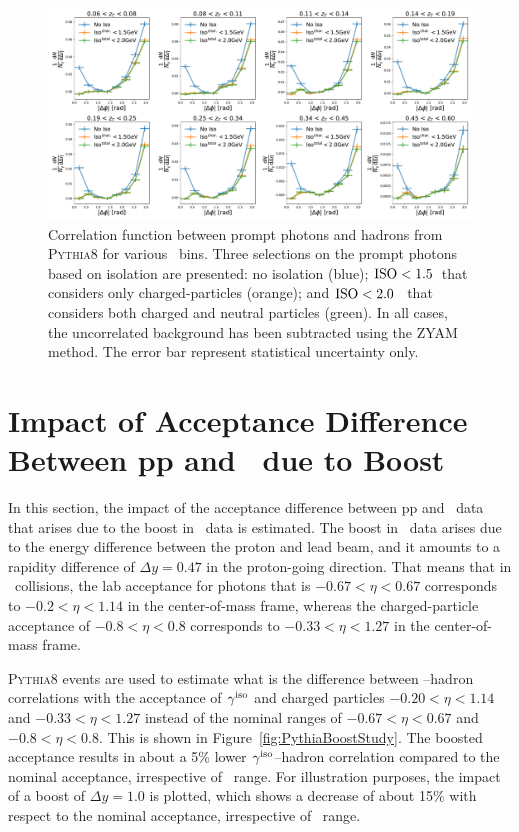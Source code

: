 \begin{figure}
\centering
\includegraphics[width = 1.0 \textwidth]{Checks_Systematics/PythiaStudyNeutralIso}
\caption{Correlation function between prompt photons and hadrons from \textsc{Pythia8} for various \zt~bins. Three selections on the prompt photons based on isolation are presented: no isolation (blue); $\mathrm{ISO}< 1.5$\GeVc~that considers only charged-particles (orange); and $\mathrm{ISO}<2.0$ \GeVc~that considers both charged and neutral particles (green). In all cases, the uncorrelated background has been subtracted using the ZYAM method. The error bar represent statistical uncertainty only. }
\label{fig:PythiaNeutralIsolation}
\end{figure}


\section{Impact of Acceptance Difference Between pp and \pPb~due to Boost}
\label{sec:bootstudy}

In this section, the impact of the acceptance difference between pp and \pPb~data that arises due to the boost in \pPb~data is estimated. The boost in \pPb~data arises due to the energy difference between the proton and lead beam, and it amounts to a rapidity difference of $\Delta y = 0.47$  in the proton-going direction. That means that in \pPb~collisions, the lab acceptance for photons that is $-0.67<\eta<0.67$ corresponds to $-0.2<\eta<1.14$ in the center-of-mass frame, whereas the charged-particle acceptance of $-0.8<\eta<0.8$ corresponds to $-0.33<\eta<1.27$  in the center-of-mass frame. 

\textsc{Pythia8} events are used to estimate what is the difference between \gammaiso--hadron correlations with the acceptance of $\gamma^\mathrm{iso}$ and charged particles  $-0.20<\eta<1.14$ and $-0.33<\eta<1.27$ instead of the nominal ranges of $-0.67<\eta<0.67$ and $-0.8<\eta<0.8$. This is shown in Figure~\ref{fig:PythiaBoostStudy}. The boosted acceptance results in about a 5\% lower $\gamma^\mathrm{iso}$--hadron correlation compared to the nominal acceptance, irrespective of \zt~range. For illustration purposes, the impact of a boost of $\Delta y =1.0$ is plotted, which shows a decrease of about 15$\%$  with respect to the nominal acceptance, irrespective of \zt~range. 

